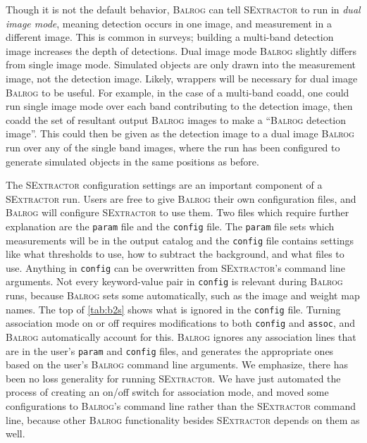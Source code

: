 \documentclass[11pt]{book}
\newcommand{\balrog}{\textsc{Balrog}}
\newcommand{\sex}{\textsc{SExtractor}}
\begin{document}
\hypertarget{hyper:dual}{}
Though it is not the default behavior, \balrog{} can tell \sex{} to run in \textit{dual image mode},
meaning detection occurs in one image, and measurement in a different image.
This is common in surveys; building a multi-band detection image increases the depth of detections. 
Dual image mode \balrog{} slightly differs from single image mode.
Simulated objects are only drawn into the measurement image, not the detection image.
Likely, wrappers will be necessary for dual image \balrog{} to be useful.
For example, in the case of a multi-band coadd, one could run single image mode over each band contributing to the detection image, 
then coadd the set of resultant output \balrog{} images to make a ``\balrog{} detection image''.
This could then be given as the detection image to a dual image \balrog{} run over any of the single band images,
where the run has been configured to generate simulated objects in the same positions as before.

\hypertarget{hyper:sexfiles}{}
The \sex{} configuration settings are an important component of a \sex{} run.
Users are free to give \balrog{} their own configuration files, and \balrog{} will configure \sex{} to use them.
Two files which require further explanation are the \texttt{param} file and the \texttt{config} file.
The \texttt{param} file sets which measurements will be in the output catalog and the \texttt{config} file
contains settings like what thresholds to use, how to subtract the background, and what files to use.
Anything in \texttt{config} can be overwritten from \sex{}'s command line arguments.
Not every keyword-value pair in \texttt{config} is relevant during \balrog{} runs,
because \balrog{} sets some automatically, such as the image and weight map names.
The top of \autoref{tab:b2s} shows what is ignored in the \texttt{config} file.
Turning association mode on or off requires modifications to both \texttt{config} and \texttt{assoc},
and \balrog{} automatically account for this.
\balrog{} ignores any association lines that are in the user's \texttt{param} and \texttt{config} files,
and generates the appropriate ones based on the user's \balrog{} command line arguments.
We emphasize, there has been no loss generality for running \sex{}.
We have just automated the process of creating an on/off switch for association mode, and moved some
configurations to \balrog{}'s command line rather than the \sex{} command line,
because other \balrog{} functionality besides \sex{} depends on them as well.
\end{document}
